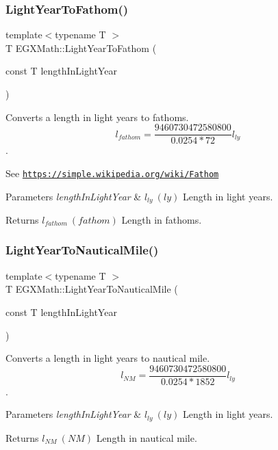 \subsubsection{\texorpdfstring{Light\+Year\+To\+Fathom()}{LightYearToFathom()}}
{\footnotesize\ttfamily template$<$typename T $>$ \\
T E\+G\+X\+Math\+::\+Light\+Year\+To\+Fathom (\begin{DoxyParamCaption}\item[{const T}]{length\+In\+Light\+Year }\end{DoxyParamCaption})}



Converts a length in light years to fathoms. \[ l_{fathom}= \frac{9460730472580800}{0.0254 * 72} l_{ly} \]. 

See \href{https://simple.wikipedia.org/wiki/Fathom}{\tt https\+://simple.\+wikipedia.\+org/wiki/\+Fathom} 
\begin{DoxyParams}{Parameters}
{\em length\+In\+Light\+Year} & $ l_{ly}\ (ly)$ Length in light years. \\
\hline
\end{DoxyParams}
\begin{DoxyReturn}{Returns}
$ l_{fathom}\ (fathom)$ Length in fathoms. 
\end{DoxyReturn}
\mbox{\label{group___e_g_x_math-_conversions-_length_conversions-_astronomical-_light_year-_nautical_ga0195b6c7d9efe06bed6d571046d485b4}} 
\subsubsection{\texorpdfstring{Light\+Year\+To\+Nautical\+Mile()}{LightYearToNauticalMile()}}
{\footnotesize\ttfamily template$<$typename T $>$ \\
T E\+G\+X\+Math\+::\+Light\+Year\+To\+Nautical\+Mile (\begin{DoxyParamCaption}\item[{const T}]{length\+In\+Light\+Year }\end{DoxyParamCaption})}



Converts a length in light years to nautical mile. \[ l_{NM}= \frac{9460730472580800}{0.0254 * 1852} l_{ly} \]. 


\begin{DoxyParams}{Parameters}
{\em length\+In\+Light\+Year} & $ l_{ly}\ (ly)$ Length in light years. \\
\hline
\end{DoxyParams}
\begin{DoxyReturn}{Returns}
$ l_{NM}\ (NM)$ Length in nautical mile. 
\end{DoxyReturn}
